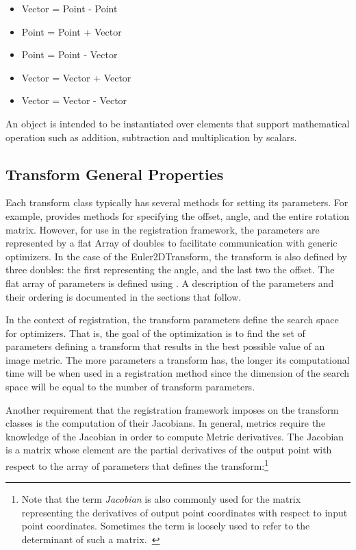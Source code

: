 \begin{itemize}
\item Vector = Point - Point
\item Point  = Point + Vector
\item Point  = Point - Vector
\item Vector = Vector + Vector
\item Vector = Vector - Vector
\end{itemize}

An  object is intended to be instantiated over elements that
support mathematical operation such as addition, subtraction and multiplication
by scalars.


\subsection{Transform General Properties}
\label{sec:TransformGeneralProperties}

 Each transform class typically has
several methods for setting its parameters.  For example,
 provides methods for specifying the offset,
angle, and the entire rotation matrix.  However, for use in the
registration framework, the parameters are represented by a flat
Array of doubles to facilitate communication with generic
optimizers. In the case of the Euler2DTransform, the transform is also
defined by three doubles: the first representing the angle, and the last two the
offset. The flat array of parameters is defined using . A
description of the parameters and their ordering is documented in the 
sections that follow.
 
In the context of registration, the transform parameters define the search
space for optimizers. That is, the goal of the optimization is to find the set
of parameters defining a transform that results in the best possible value of
an image metric. The more parameters a transform has, the longer its
computational time will be when used in a registration method since the
dimension of the search space will be equal to the number of transform
parameters.


Another requirement that the registration framework imposes on the transform
classes is the computation of their Jacobians. In general, metrics require
the knowledge of the Jacobian in order to compute Metric derivatives.
The Jacobian is a matrix whose element are the partial derivatives of the
output point with respect to the array of parameters that defines the
transform:\footnote{Note that the term \emph{Jacobian} is also commonly used
for the matrix representing the derivatives of output point coordinates with
respect to input point coordinates. Sometimes the term is loosely used to
refer to the determinant of such a matrix.~\cite{Dodson1997}}

